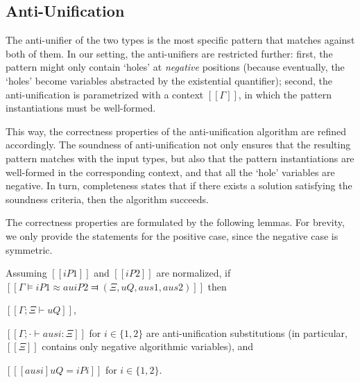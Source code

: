         

\subsection{Anti-Unification}

The anti-unifier of the two types is the most specific pattern that matches
against both of them. In our setting, the anti-unifiers are restricted further:
first, the pattern might only contain `holes' at \emph{negative} positions
(because eventually, the `holes' become variables abstracted by the
existential quantifier); second, the anti-unification is parametrized with a
context $[[Γ]]$, in which the pattern instantiations must be well-formed.

This way, the correctness properties of the anti-unification algorithm are
refined accordingly. The soundness of anti-unification not only ensures that the
resulting pattern matches with the input types, but also that the pattern
instantiations are well-formed in the corresponding context, and that all the
`hole' variables are negative. In turn, completeness states that if there
exists a solution satisfying the soundness criteria, then the algorithm
succeeds.


The correctness properties are formulated by the following lemmas. For brevity,
we only provide the statements for the positive case, since the negative case is
symmetric. 


\begin{lemma*}
    \label{lemma:au-soundness}
     Assuming $[[iP1]]$ and $[[iP2]]$ are normalized,
    if $[[Γ ⊨ iP1 ≈au iP2 ⫤ (Ξ, uQ, aus1, aus2)]]$
    then 
    \begin{enumerate*}
        \item $[[Γ ; Ξ ⊢ uQ]]$,
        \item $[[Γ ; · ⊢ ausi : Ξ]]$ for $i \in \{1,2\}$
        are anti-unification substitutions (in particular, $[[Ξ]]$ contains only negative algorithmic variables), and
        \item $[[ [ausi] uQ = iPi ]]$ for $i \in \{1,2\}$.
    \end{enumerate*}
\end{lemma*}

